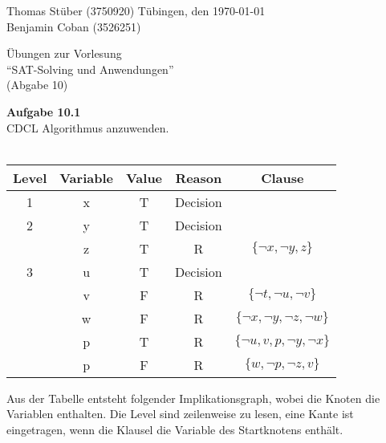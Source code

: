\documentclass[a4paper,10pt]{article}
\title{}
\author{}
\begin{document}
\noindent Thomas Stüber (3750920) \hfill Tübingen, den  \today\\
\noindent Benjamin Coban (3526251) \\
\begin{center}
\Large Übungen zur Vorlesung  \\ ``SAT-Solving und Anwendungen'' \\
\vspace*{2mm}
\large (Abgabe 10) \\
\vspace*{2mm}
\end{center}

\noindent\textbf{Aufgabe 10.1}\\
CDCL Algorithmus anzuwenden.\\\\
\begin{center}
	\begin{tabular}{|c|c|c|c|c|}
		\hline 
		Level & Variable & Value & Reason & Clause \\ 
		\hline 
		1 & x & T & Decision &  \\ 
		\hline 
		2 & y & T & Decision &  \\ 
		\hline 
		& z & T & R & $\{ \neg x,\neg y, z\}$ \\ 
	 
		\hline 
		3 & u & T & Decision &  \\ 
		\hline 
		& v & F & R & $\{ \neg t,\neg u,\neg v\}$ \\ 
		\hline
		& w & F & R & $\{ \neg x,\neg y,\neg z,\neg w\}$ \\ 
		\hline 
		& p & T & R & $\{ \neg u, v,p,\neg y,\neg x\}$ \\ 
		\hline 
		& p  & F & R & $\{ w,\neg p, \neg z, v\}$ \\ 
		\hline 
	\end{tabular} 
\end{center}
Aus der Tabelle entsteht folgender Implikationsgraph, wobei die Knoten die Variablen enthalten. Die Level sind zeilenweise zu lesen, eine Kante ist eingetragen, wenn die Klausel die Variable des Startknotens enthält. 
\end{document}
